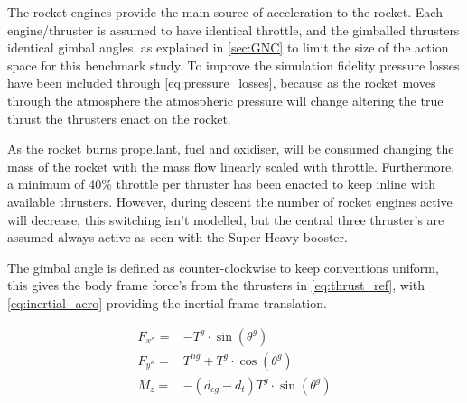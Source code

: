 The rocket engines provide the main source of acceleration to the rocket. Each engine/thruster is assumed to have identical throttle, and the gimballed thrusters identical gimbal angles, as explained in \autoref{sec:GNC} to limit the size of the action space for this benchmark study. To improve the simulation fidelity pressure losses have been included through \autoref{eq:pressure_losses}, because as the rocket moves through the atmosphere the atmospheric pressure will change altering the true thrust the thrusters enact on the rocket.

As the rocket burns propellant, fuel and oxidiser, will be consumed changing the mass of the rocket with the mass flow linearly scaled with throttle. Furthermore, a minimum of 40\% throttle per thruster has been enacted to keep inline with available thrusters. However, during descent the number of rocket engines active will decrease, this switching isn't modelled, but the central three thruster's are assumed always active as seen with the Super Heavy booster.

The gimbal angle is defined as counter-clockwise to keep conventions uniform, this gives the body frame force's from the thrusters in \autoref{eq:thrust_ref}, with \autoref{eq:inertial_aero} providing the inertial frame translation.

\begin{equation}
\begin{aligned}
    F_{x''} =& - T^g \cdot \sin(\theta^g) \\
    F_{y''} =& T^{ng} + T^g \cdot \cos(\theta^g) \\
    M_z =& -(d_{cg} - d_{t}) T^g \cdot \sin(\theta^g)
\end{aligned}
\label{eq:thrust_ref}
\end{equation}